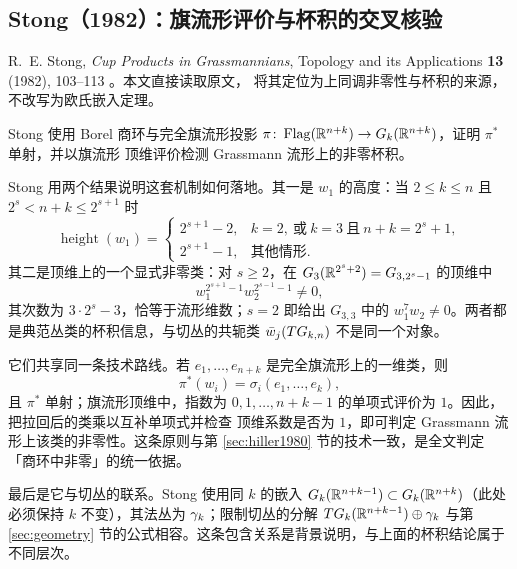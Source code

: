 \subsection{Stong（1982）：旗流形评价与杯积的交叉核验}
\label{sec:stong}

\begin{remark*}[文献核验状态]
R.~E. Stong, \emph{Cup Products in Grassmannians}, Topology and its
Applications \textbf{13} (1982), 103--113 \cite{Stong1982}。本文直接读取原文，
将其定位为上同调非零性与杯积的来源，不改写为欧氏嵌入定理。
\end{remark*}

Stong 使用 Borel 商环与完全旗流形投影
$\pi\colon\operatorname{Flag}(\mathbb{R}^{n+k})\to G_k(\mathbb{R}^{n+k})$，证明 $\pi^{*}$ 单射，并以旗流形
顶维评价检测 Grassmann 流形上的非零杯积。

Stong 用两个结果说明这套机制如何落地。其一是 $w_1$ 的高度：当 $2\le k\le n$ 且
$2^{s}<n+k\le2^{s+1}$ 时
\begin{equation*}
  \operatorname{height}(w_1)=
  \begin{cases}
    2^{s+1}-2, & k=2,\ \text{或}\ k=3\ \text{且}\ n+k=2^{s}+1,\\[2pt]
    2^{s+1}-1, & \text{其他情形}.
  \end{cases}
\end{equation*}
其二是顶维上的一个显式非零类：对 $s\ge2$，在
$G_3(\mathbb{R}^{2^{s}+2})=G_{3,2^{s}-1}$ 的顶维中
\begin{equation*}
  w_1^{2^{s+1}-1}w_2^{2^{s-1}-1}\neq0,
\end{equation*}
其次数为 $3\cdot2^{s}-3$，恰等于流形维数；$s=2$ 即给出 $G_{3,3}$ 中的
$w_1^{7}w_2\neq0$。两者都是典范丛类的杯积信息，与切丛的共轭类 $\bar w_j(TG_{k,n})$
不是同一个对象。

它们共享同一条技术路线。若 $e_1,\dots,e_{n+k}$ 是完全旗流形上的一维类，则
\begin{equation*}
  \pi^{*}(w_i)=\sigma_i(e_1,\dots,e_k),
\end{equation*}
且 $\pi^{*}$ 单射；旗流形顶维中，指数为
$0,1,\dots,n+k-1$ 的单项式评价为 $1$。因此，把拉回后的类乘以互补单项式并检查
顶维系数是否为 $1$，即可判定 Grassmann 流形上该类的非零性。这条原则与第
\ref{sec:hiller1980} 节的技术一致，是全文判定「商环中非零」的统一依据。

最后是它与切丛的联系。Stong 使用同 $k$ 的嵌入
$G_k(\mathbb{R}^{n+k-1})\subset G_k(\mathbb{R}^{n+k})$（此处必须保持 $k$ 不变），其法丛为
$\gamma_k$；限制切丛的分解 $TG_k(\mathbb{R}^{n+k-1})\oplus\gamma_k$ 与第
\ref{sec:geometry} 节的公式相容。这条包含关系是背景说明，与上面的杯积结论属于
不同层次。

